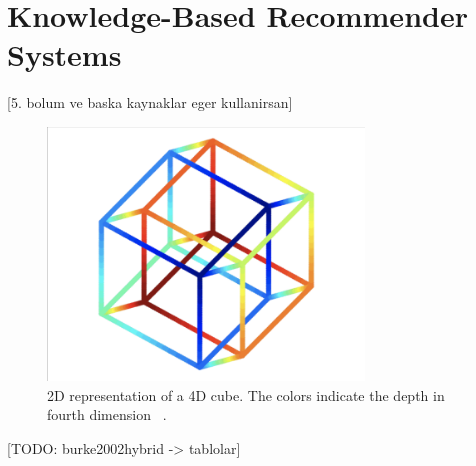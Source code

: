 
\section{Knowledge-Based Recommender Systems}\label{chapter:knowledge_based}

[5. bolum ve baska kaynaklar eger kullanirsan]


 \begin{figure}[!ht]
	\centering
	\includegraphics[width=0.75\textwidth]{figures/DimensionalityReduction.png}
	\caption{2D representation of a 4D cube. The colors indicate the depth in fourth dimension ~\parencite{lee2007nonlinear}.}
	\label{fig:embedding-projection-example}
\end{figure}

[TODO: burke2002hybrid -> tablolar]